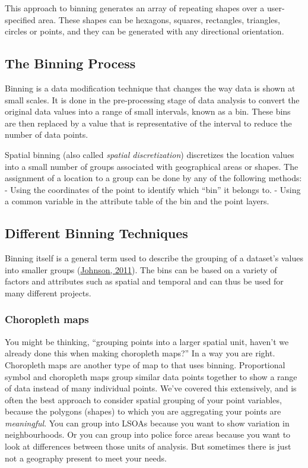 \documentclass[
]{book}
\begin{document}
This approach to binning generates an array of repeating shapes over a user-specified area. These shapes can be hexagons, squares, rectangles, triangles, circles or points, and they can be generated with any directional orientation.

\hypertarget{the-binning-process}{%
\subsection{The Binning Process}\label{the-binning-process}}

Binning is a data modification technique that changes the way data is shown at small scales. It is done in the pre-processing stage of data analysis to convert the original data values into a range of small intervals, known as a bin. These bins are then replaced by a value that is representative of the interval to reduce the number of data points.

Spatial binning (also called \emph{spatial discretization}) discretizes the location values into a small number of groups associated with geographical areas or shapes. The assignment of a location to a group can be done by any of the following methods:
- Using the coordinates of the point to identify which ``bin'' it belongs to.
- Using a common variable in the attribute table of the bin and the point layers.

\hypertarget{different-binning-techniques}{%
\subsection{Different Binning Techniques}\label{different-binning-techniques}}

Binning itself is a general term used to describe the grouping of a dataset's values into smaller groups (\href{http://indiemaps.com/blog/2011/10/hexbins/}{Johnson, 2011}). The bins can be based on a variety of factors and attributes such as spatial and temporal and can thus be used for many different projects.

\hypertarget{choropleth-maps-1}{%
\subsubsection{Choropleth maps}\label{choropleth-maps-1}}

You might be thinking, ``grouping points into a larger spatial unit, haven't we already done this when making choropleth maps?'' In a way you are right. Choropleth maps are another type of map to that uses binning. Proportional symbol and choropleth maps group similar data points together to show a range of data instead of many individual points. We've covered this extensively, and is often the best approach to consider spatial grouping of your point variables, because the polygons (shapes) to which you are aggregating your points are \emph{meaningful}. You can group into LSOAs because you want to show variation in neighbourhoods. Or you can group into police force areas because you want to look at differences between those units of analysis. But sometimes there is just not a geography present to meet your needs.
\end{document}
